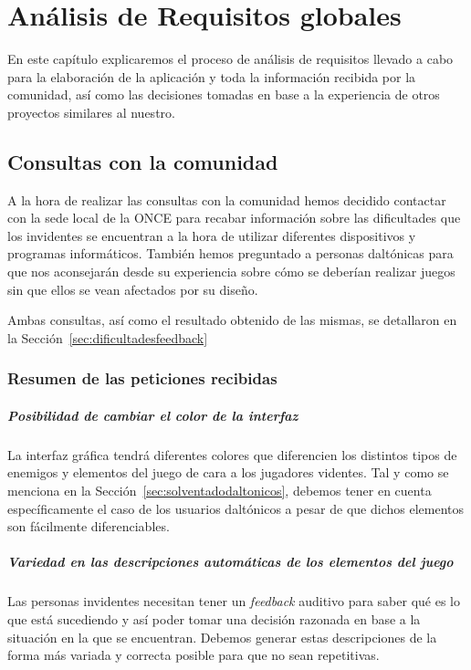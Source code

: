 \chapter[Análisis de Requisitos]{Análisis de Requisitos globales}

En este capítulo explicaremos el proceso de análisis de requisitos llevado a cabo para la elaboración de la aplicación y toda la información recibida por la comunidad, así como las decisiones tomadas en base a la experiencia de otros proyectos similares al nuestro.

\section{Consultas con la comunidad}

A la hora de realizar las consultas con la comunidad hemos decidido contactar con la sede local de la ONCE para recabar información sobre las dificultades que los invidentes se encuentran a la hora de utilizar diferentes dispositivos y programas informáticos.
También hemos preguntado a personas daltónicas para que nos aconsejarán desde su experiencia sobre cómo se deberían realizar juegos sin que ellos se vean afectados por su diseño.

Ambas consultas, así como el resultado obtenido de las mismas, se detallaron en la Sección~\ref{sec:dificultadesfeedback} 

\subsection{Resumen de las peticiones recibidas}
	\paragraph{Posibilidad de cambiar el color de la interfaz} La interfaz gráfica tendrá diferentes colores que diferencien los distintos tipos de enemigos y elementos del juego de cara a los jugadores videntes. Tal y como se menciona en la Sección~\ref{sec:solventadodaltonicos}, debemos tener en cuenta específicamente el caso de los usuarios daltónicos a pesar de que dichos elementos son fácilmente diferenciables.
	\paragraph{Variedad en las descripciones automáticas de los elementos del juego} Las personas invidentes necesitan tener un \textit{feedback} auditivo para saber qué es lo que está sucediendo y así poder tomar una decisión razonada en base a la situación en la que se encuentran. Debemos generar estas descripciones de la forma más variada y correcta posible para que no sean repetitivas. 
